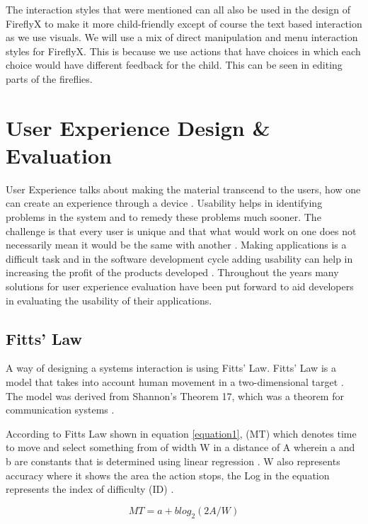 The interaction styles that were mentioned can all also be used in the design of FireflyX to make it more child-friendly except of course the text based interaction as we use visuals. We will use a mix of direct manipulation and menu interaction styles for FireflyX. This is because we use actions that have choices in which each choice would have different feedback for the child. This can be seen in editing parts of the fireflies. 


\section{User Experience Design & Evaluation}
User Experience talks about making the material transcend to the users, how one can create an experience through a device \cite{stephanidis2012encyclopedia}. Usability helps in identifying problems in the system and to remedy these problems much sooner. The challenge is that every user is unique and that what would work on one does not necessarily mean it would be the same with another \cite{tidwell2010designing}. Making applications is a difficult task and in the software development cycle adding usability can help in increasing the profit of the products developed \cite{bellamy2011deploying}. Throughout the years many solutions for user experience evaluation have been put forward to aid developers in evaluating the usability of their applications. 
    
\subsection{Fitts' Law}
A way of designing a systems interaction is using Fitts' Law. Fitts' Law is a model that takes into account human movement in a two-dimensional target \cite{mackenzie1992extending}. The model was derived from Shannon's Theorem 17, which was a theorem for communication systems \cite{mackenzie1992fitts}. 

According to Fitts Law shown in equation \ref{equation1}, (MT) which denotes time to move and select something from of width W in a distance of A wherein a and b are constants that is determined using linear regression \cite{mackenzie1992extending}. W also represents accuracy where it shows the area the action stops, the Log in the equation represents the index of difficulty (ID) \cite{mackenzie1992extending}. 

\begin{equation}
  MT = a + b log_{2}(2A/W) 
  \label{equation1}
\end{equation}

